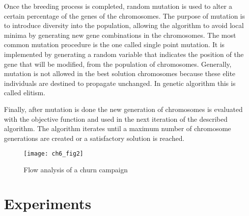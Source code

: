 Once the breeding process is completed, random mutation is used to alter a certain percentage of the 
genes of the chromosomes. The purpose of mutation is to introduce diversity into the population, 
allowing the algorithm to avoid local minima by generating new gene combinations in the chromosomes. 
The most common mutation procedure is the one called single point mutation. It is implemented by 
generating a random variable that indicates the position of the gene that will be modified, from the 
population of chromosomes. Generally, mutation is not allowed in the best solution chromosomes 
because these elite individuals are destined to propagate unchanged. In genetic algorithm this 
is called elitism.

Finally, after mutation is done the new generation of chromosomes is evaluated with the objective 
function and used in the next iteration of the described algorithm.
The algorithm iterates until a maximum number of chromosome generations are created or a 
satisfactory solution is reached.

	\begin{figure}[t]
	  \centering
    \texttt{[image: ch6\_fig2]}  
	  \caption{Flow analysis of a churn campaign \citep{Haupt2004}}
	  \label{fig:6:geneticalgorithms}
	\end{figure}

\section{Experiments}